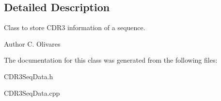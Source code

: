 \subsection{Detailed Description}
Class to store C\+D\+R3 information of a sequence. 

\begin{DoxyAuthor}{Author}
C. Olivares 
\end{DoxyAuthor}


The documentation for this class was generated from the following files\+:\begin{DoxyCompactItemize}
\item 
C\+D\+R3\+Seq\+Data.\+h\item 
C\+D\+R3\+Seq\+Data.\+cpp\end{DoxyCompactItemize}

